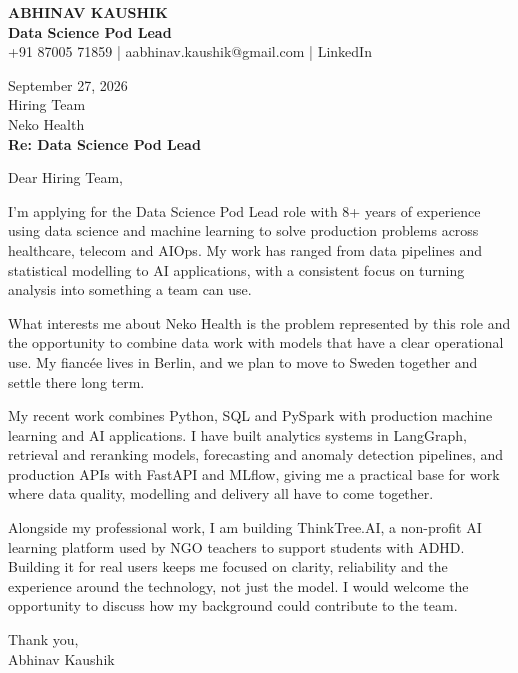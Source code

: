 \documentclass[10pt,a4paper]{article}
\begin{document}
\begin{center}
{\Large\bfseries ABHINAV KAUSHIK}\\[2pt]
{\bfseries Data Science Pod Lead}\\[2pt]
+91 87005 71859 \quad | \quad aabhinav.kaushik@gmail.com \quad | \quad LinkedIn
\end{center}
\vspace{8pt}
September 27, 2026\\[6pt]
Hiring Team\\
Neko Health\\[4pt]
\textbf{Re: Data Science Pod Lead}

Dear Hiring Team,

I’m applying for the Data Science Pod Lead role with 8+ years of experience using data science and machine learning to solve production problems across healthcare, telecom and AIOps. My work has ranged from data pipelines and statistical modelling to AI applications, with a consistent focus on turning analysis into something a team can use.

What interests me about Neko Health is the problem represented by this role and the opportunity to combine data work with models that have a clear operational use. My fiancée lives in Berlin, and we plan to move to Sweden together and settle there long term.

My recent work combines Python, SQL and PySpark with production machine learning and AI applications. I have built analytics systems in LangGraph, retrieval and reranking models, forecasting and anomaly detection pipelines, and production APIs with FastAPI and MLflow, giving me a practical base for work where data quality, modelling and delivery all have to come together.

Alongside my professional work, I am building ThinkTree.AI, a non-profit AI learning platform used by NGO teachers to support students with ADHD. Building it for real users keeps me focused on clarity, reliability and the experience around the technology, not just the model. I would welcome the opportunity to discuss how my background could contribute to the team.

Thank you,\\
Abhinav Kaushik
\end{document}
